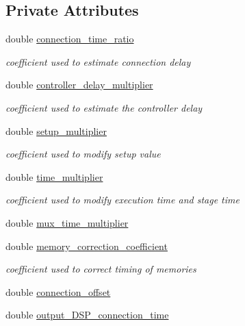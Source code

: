 \subsection*{Private Attributes}
\begin{DoxyCompactItemize}
\item 
double \hyperlink{classAllocationInformation_a2eb0f9c49d0ed6b54b7aaf5762f7defa}{connection\+\_\+time\+\_\+ratio}
\begin{DoxyCompactList}\small\item\em coefficient used to estimate connection delay \end{DoxyCompactList}\item 
double \hyperlink{classAllocationInformation_a5c4f2f79bd43d7a6d0c1d60d9afa4f09}{controller\+\_\+delay\+\_\+multiplier}
\begin{DoxyCompactList}\small\item\em coefficient used to estimate the controller delay \end{DoxyCompactList}\item 
double \hyperlink{classAllocationInformation_ad031131df1115300dffd3e353f0e01e2}{setup\+\_\+multiplier}
\begin{DoxyCompactList}\small\item\em coefficient used to modify setup value \end{DoxyCompactList}\item 
double \hyperlink{classAllocationInformation_a0827cc03477802e06ff5b4714b2e5116}{time\+\_\+multiplier}
\begin{DoxyCompactList}\small\item\em coefficient used to modify execution time and stage time \end{DoxyCompactList}\item 
double \hyperlink{classAllocationInformation_a439a1f4328391e8ff2d88cad68f5f5a8}{mux\+\_\+time\+\_\+multiplier}
\item 
double \hyperlink{classAllocationInformation_afb748de8a2e27b3421e7cef5aee235f0}{memory\+\_\+correction\+\_\+coefficient}
\begin{DoxyCompactList}\small\item\em coefficient used to correct timing of memories \end{DoxyCompactList}\item 
double \hyperlink{classAllocationInformation_a06421d1dec79f9f4050de57d4f1b3c9b}{connection\+\_\+offset}
\item 
double \hyperlink{classAllocationInformation_a2d1c7a9b63182520110f7a03443fd2f0}{output\+\_\+\+D\+S\+P\+\_\+connection\+\_\+time}

\end{DoxyCompactItemize}
